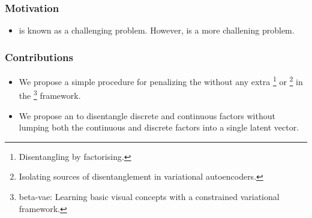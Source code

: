 \documentclass[10pt,mathserif]{beamer}
\begin{document}
\begin{frame}
\frametitle{Motivation}
\begin{itemize}\itemsep=20pt
\item {\color{blue}{Learning discrete representations}} is known as a challenging problem. However, {\color{blue}{learning continuous and discrete representations}} is a more challening problem.
\end{itemize}
\end{frame}



\begin{frame}
\frametitle{Contributions}
\begin{itemize}\itemsep=20pt
        \item We propose a simple procedure for penalizing the {\color{blue}{total correlation}} without any extra {\color{blue}{discriminator network(FactorVAE)}}\footnote{{\color{blue}{Kim, H. and Mnih, A.}} Disentangling by factorising. {\color{gray}{ICML2018}}} or {\color{blue}{importance sampling}} \footnote{{\color{blue}{Chen, T. Q., Li, X., Grosse, R. B., and Duvenaud, D. K.}} Isolating sources of disentanglement in variational autoencoders. {\color{gray}{NIPS2018}}} in the {\color{blue}{$\beta$-VAE}} \footnote{{\color{blue}{Higgins, I., Matthey, L., Pal, A., Burgess, C., Glorot, X., Botvinick, M., Mohamed, S., and Lerchner, A.}} beta-vae: Learning basic visual concepts with a constrained variational framework. {\color{gray}{ICLR2017}}} framework.\pause
\item We propose an {\color{blue}{alternating disentanglement method}} to disentangle discrete and continuous factors without lumping both the continuous and discrete factors into a single latent vector.
\end{itemize}
\end{frame}
\end{document}
